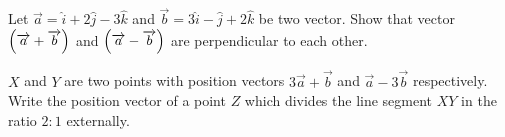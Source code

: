  \item Let $\overrightarrow{a}=\hat{i}+2\hat{j}-3\hat{k}$ and $\overrightarrow{b}=3\hat{i}-\hat{j}+2\hat{k}$ be two vector. Show that vector $\left(\overrightarrow{a}+\overrightarrow{b}\right)$ and $\left(\overrightarrow{a}-\overrightarrow{b}\right)$ are perpendicular to each other. 

      \item $X$ and $Y$ are two points with position vectors $3\overrightarrow{a}+\overrightarrow{b}$ and $\overrightarrow{a}-3\overrightarrow{b}$ respectively. Write the position vector of a point $Z$ which divides the line segment $XY$ in the ratio $2:1$ externally.

